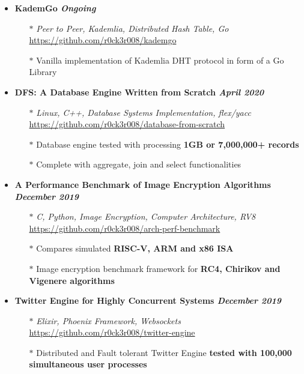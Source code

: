 \documentclass[10]{Resume}
\begin{document}
\begin{itemize}[noitemsep,nolistsep]
	\item\textbf{KademGo \hfill \textit{Ongoing}}
		\begin{itemize}[leftmargin=*]
			\setlength\itemsep{-0.25em}
			\item[$\ast$]\textit{Peer to Peer, Kademlia, Distributed Hash Table, Go} \hfill \href{https://github.com/r0ck3r008/kademgo}{{\scriptsize https://github.com/r0ck3r008/kademgo}}
			\item[$\ast$]Vanilla implementation of Kademlia DHT protocol in form of a Go Library
		\end{itemize}

	\item\textbf{DFS: A Database Engine Written from Scratch \hfill \textit{April 2020}}
		\begin{itemize}[leftmargin=*]
			\setlength\itemsep{-0.25em}
			\item[$\ast$]\textit{Linux, C++, Database Systems Implementation, flex/yacc} \hfill \href{https://github.com/r0ck3r008/database-from-scratch}{{\scriptsize https://github.com/r0ck3r008/database-from-scratch}}
			\item[$\ast$]Database engine tested with processing \textbf{1GB or 7,000,000+ records}
			\item[$\ast$]Complete with aggregate, join and select functionalities
		\end{itemize}

	\item\textbf{A Performance Benchmark of Image Encryption Algorithms \hfill \textit{December 2019}}
		\begin{itemize}[leftmargin=*]
			\setlength\itemsep{-0.25em}
			\item[$\ast$]\textit{C, Python, Image Encryption, Computer Architecture, RV8} \hfill \href{https://github.com/r0ck3r008/arch-perf-benchmark}{{\scriptsize https://github.com/r0ck3r008/arch-perf-benchmark}}
			\item[$\ast$]Compares simulated \textbf{RISC-V, ARM and x86 ISA}
			\item[$\ast$]Image encryption benchmark framework for \textbf{RC4, Chirikov and Vigenere algorithms}
		\end{itemize}

	\item\textbf{Twitter Engine for Highly Concurrent Systems \hfill \textit{December 2019}}
		\begin{itemize}[leftmargin=*]
			\setlength\itemsep{-0.25em}
			\item[$\ast$]\textit{Elixir, Phoenix Framework, Websockets} \hfill \href{https://github.com/r0ck3r008/twitter-engine}{{\scriptsize https://github.com/r0ck3r008/twitter-engine}}
			\item[$\ast$]Distributed and Fault tolerant Twitter Engine \textbf{tested with 100,000 simultaneous user processes}
		\end{itemize}


\end{itemize}
\end{document}
